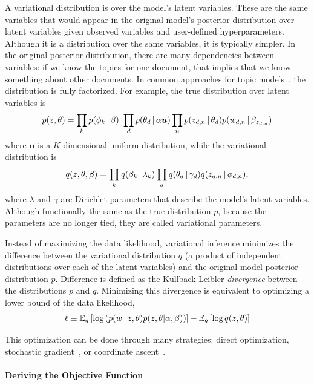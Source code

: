 A variational distribution is over the model's latent variables.
These are the same variables that would appear in the original model's posterior distribution over latent variables given observed variables and user-defined hyperparameters.
Although it is a distribution over the same variables, it is typically
simpler.  
In the original posterior distribution, there are many dependencies between variables: if we know the topics for one document, that implies that we know something about other documents.
In common approaches for topic models~\citep{blei-03}, the
distribution is fully factorized.  For example, the true distribution
over latent variables is
\begin{equation}
p(z, \theta) = \prod_k p(\phi_k \g \beta) \ \prod_d p(\theta_d \g
    \alpha {\bm u}) \prod_n p(z_{d,n} \g \theta_d) p(w_{d,n} \g
    \beta_{z_{d,n}})
\end{equation}
where ${\bm u}$ is a $K$-dimensional uniform distribution, while the variational distribution is
\begin{equation}
q(z, \theta, \beta) = \prod_k q(\beta_k \, | \, \lambda_k) \prod_d q(\theta_d
  \, | \, \gamma_d) q(z_{d,n} \, | \, \phi_{d,n}),
\end{equation}
where $\lambda$ and $\gamma$ are Dirichlet parameters that describe
the model's latent variables.
Although functionally the same as the
true distribution $p$, because the parameters are no longer tied,
they are called variational parameters.

Instead of maximizing the data likelihood, variational inference
minimizes the difference between the variational distribution $q$ (a product of independent distributions over each of the latent variables) and the original model posterior distribution $p$.
Difference is defined as the Kullback-Leibler
\emph{divergence} between the distributions $p$ and $q$.  Minimizing this divergence is
equivalent to optimizing a lower bound of the data likelihood,
\begin{equation}
  \ell \equiv \mathbb{E}_{q}\left[ \log \left(p(w \, | \, z, \theta) p(z, \theta | \alpha,
      \beta) \right)  \right] - \mathbb{E}_{q}\left[ \log q(z, \theta) \right]
\label{eq:obj}
\end{equation}

This optimization can be done through many strategies: direct
optimization, stochastic gradient~\citep{hoffman-10}, or coordinate
ascent~\citep{blei-03}.

\paragraph{Deriving the Objective Function}

